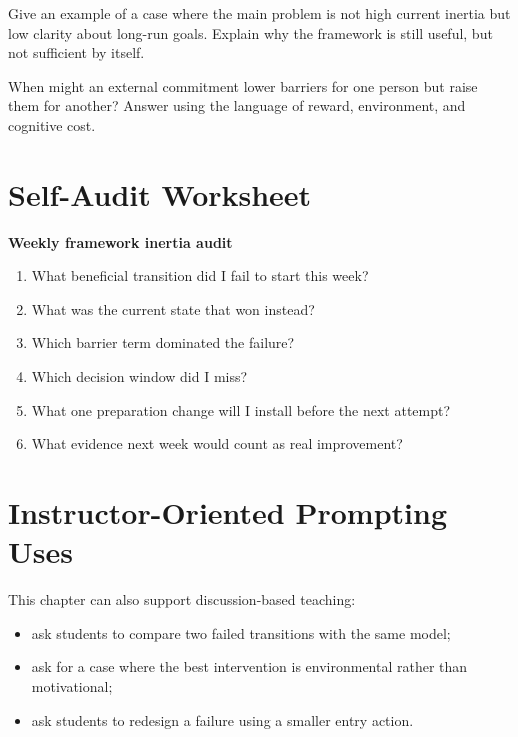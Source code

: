\begin{exercisebox}
\begin{exercise}
Give an example of a case where the main problem is not high current inertia
but low clarity about long-run goals. Explain why the framework is still
useful, but not sufficient by itself.
\end{exercise}

\begin{exercise}
When might an external commitment lower barriers for one person but raise them
for another? Answer using the language of reward, environment, and cognitive
cost.
\end{exercise}
\end{exercisebox}

\section{Self-Audit Worksheet}

\begin{templatebox}
\textbf{Weekly framework inertia audit}
\begin{enumerate}[nosep]
  \item What beneficial transition did I fail to start this week?
  \item What was the current state that won instead?
  \item Which barrier term dominated the failure?
  \item Which decision window did I miss?
  \item What one preparation change will I install before the next attempt?
  \item What evidence next week would count as real improvement?
\end{enumerate}
\end{templatebox}

\section{Instructor-Oriented Prompting Uses}

This chapter can also support discussion-based teaching:
\begin{itemize}[nosep]
  \item ask students to compare two failed transitions with the same model;
  \item ask for a case where the best intervention is environmental rather than
        motivational;
  \item ask students to redesign a failure using a smaller entry action.
\end{itemize}


